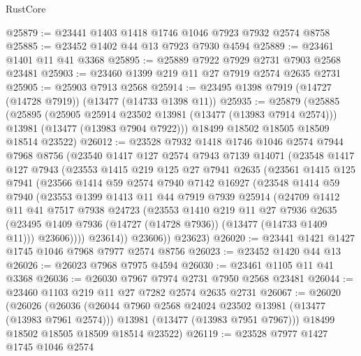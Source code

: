 \begin{lexlean}{RustCore}
\begin{coremodule}
@25879 := @23441 @1403 @1418 @1746 @1046 @7923 @7932 @2574 @8758
@25885 := @23452 @1402 @44 @13 @7923 @7930 @4594
@25889 := @23461 @1401 @11 @41 @3368
@25895 := @25889 @7922 @7929 @2731 @7903 @2568 @23481
@25903 := @23460 @1399 @219 @11 @27 @7919 @2574 @2635 @2731
@25905 := @25903 @7913 @2568
@25914 := @23495 @1398 @7919 (@14727 (@14728 @7919)) (@13477 (@14733 @1398 @11))
@25935 := @25879
    (@25885
      (@25895
        (@25905 @25914 @23502 @13981 (@13477 (@13983 @7914 @2574)))
        @13981
        (@13477 (@13983 @7904 @7922)))
      @18499
      @18502
      @18505
      @18509
      @18514
      @23522)
@26012 := @23528
    @7932
    @1418
    @1746
    @1046
    @2574
    @7944
    @7968
    @8756
    (@23540
      @1417
      @127
      @2574
      @7943
      @7139
      @14071
      (@23548
        @1417
        @127
        @7943
        (@23553
          @1415
          @219
          @125
          @27
          @7941
          @2635
          (@23561
            @1415
            @125
            @7941
            (@23566
              @1414
              @59
              @2574
              @7940
              @7142
              @16927
              (@23548
                @1414
                @59
                @7940
                (@23553
                  @1399
                  @1413
                  @11
                  @44
                  @7919
                  @7939
                  @25914
                  (@24709
                    @1412
                    @11
                    @41
                    @7517
                    @7938
                    @24723
                    (@23553
                      @1410
                      @219
                      @11
                      @27
                      @7936
                      @2635
                      (@23495 @1409 @7936 (@14727 (@14728 @7936)) (@13477 (@14733 @1409 @11)))
                      @23606))))
              @23614))
          @23606))
      @23623)
@26020 := @23441 @1421 @1427 @1745 @1046 @7968 @7977 @2574 @8756
@26023 := @23452 @1420 @44 @13
@26026 := @26023 @7968 @7975 @4594
@26030 := @23461 @1105 @11 @41 @3368
@26036 := @26030 @7967 @7974 @2731 @7950 @2568 @23481
@26044 := @23460 @1103 @219 @11 @27 @7282 @2574 @2635 @2731
@26067 := @26020
    (@26026
      (@26036
        (@26044 @7960 @2568 @24024 @23502 @13981 (@13477 (@13983 @7961 @2574)))
        @13981
        (@13477 (@13983 @7951 @7967)))
      @18499
      @18502
      @18505
      @18509
      @18514
      @23522)
@26119 := @23528
    @7977
    @1427
    @1745
    @1046
    @2574

\end{coremodule}
\end{lexlean}
